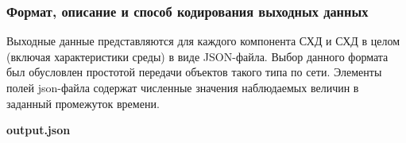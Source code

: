 \subsubsection{Формат, описание и способ кодирования выходных данных}

Выходные данные представляются для каждого компонента СХД и СХД в целом (включая характеристики среды) в виде  JSON-файла. Выбор данного формата был обусловлен простотой передачи объектов такого типа по сети. Элементы полей json-файла содержат численные значения наблюдаемых величин в заданный промежуток времени.

\textbf{output.json}




